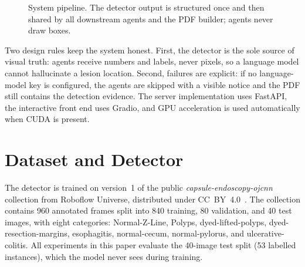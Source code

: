 \documentclass[conference]{IEEEtran}
\begin{document}
\begin{figure}[t]
\centering
{}
\caption{System pipeline. The detector output is structured once and then
shared by all downstream agents and the PDF builder; agents never draw boxes.}
\label{fig:arch}
\end{figure}

Two design rules keep the system honest. First, the detector is the sole
source of visual truth: agents receive numbers and labels, never pixels, so a
language model cannot hallucinate a lesion location. Second, failures are
explicit: if no language-model key is configured, the agents are skipped with
a visible notice and the PDF still contains the detection evidence. The
server implementation uses FastAPI, the interactive front end uses Gradio, and
GPU acceleration is used automatically when CUDA is present.

\section{Dataset and Detector}
\label{sec:data}

The detector is trained on version~1 of the public
\textit{capsule-endoscopy-ojcnn} collection from Roboflow Universe,
distributed under CC~BY~4.0~\cite{roboflowcapsule}. The collection contains
960 annotated frames split into 840 training, 80 validation, and 40 test
images, with eight categories: Normal-Z-Line, Polyps, dyed-lifted-polyps,
dyed-resection-margins, esophagitis, normal-cecum, normal-pylorus, and
ulcerative-colitis. All experiments in this paper evaluate the 40-image test
split (53 labelled instances), which the model never sees during training.
\end{document}
